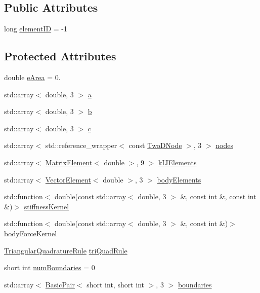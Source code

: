 \subsection*{Public Attributes}
\begin{DoxyCompactItemize}
\item 
long \hyperlink{a00764_a5feb92c27270536c92fcb39c6fecc00d}{element\+ID} = -\/1
\end{DoxyCompactItemize}
\subsection*{Protected Attributes}
\begin{DoxyCompactItemize}
\item 
double \hyperlink{a00764_ab74cbf3ff783201003c53439f79307e4}{e\+Area} = 0.
\item 
std\+::array$<$ double, 3 $>$ \hyperlink{a00764_af5cd851c5a4385f954bfc31b8eca81be}{a}
\item 
std\+::array$<$ double, 3 $>$ \hyperlink{a00764_a6581eba2e216eb5f3e93e047be680a82}{b}
\item 
std\+::array$<$ double, 3 $>$ \hyperlink{a00764_a2a9d18beac7fccf750846723ddf73d1d}{c}
\item 
std\+::array$<$ std\+::reference\+\_\+wrapper$<$ const \hyperlink{a00189_a92dafcc05a788e1065a5792b67f0f70e}{Two\+D\+Node} $>$, 3 $>$ \hyperlink{a00764_a6275d38ed2cfa924b1a36e0f98ce7c16}{nodes}
\item 
std\+::array$<$ \hyperlink{a00189_a1a12603621e7a1efa59ac5cb79f9d509}{Matrix\+Element}$<$ double $>$, 9 $>$ \hyperlink{a00764_a9126763a046ac0736d72b6b5d20ba80d}{k\+I\+J\+Elements}
\item 
std\+::array$<$ \hyperlink{a00189_a08f01d4bb892cf7b2386d0f3a8643d72}{Vector\+Element}$<$ double $>$, 3 $>$ \hyperlink{a00764_a8a85094c0060a67aa1b6abf4a5e660a6}{body\+Elements}
\item 
std\+::function$<$ double(const std\+::array$<$ double, 3 $>$ \&, const int \&, const int \&)$>$ \hyperlink{a00764_ae2480b5335fe78245cb1006e3eeb034d}{stiffness\+Kernel}
\item 
std\+::function$<$ double(const std\+::array$<$ double, 3 $>$ \&, const int \&)$>$ \hyperlink{a00764_a48dbf56bce64a1e97332b03309720154}{body\+Force\+Kernel}
\item 
\hyperlink{a00856}{Triangular\+Quadrature\+Rule} \hyperlink{a00764_a5e50303ae2cfb783f44de143be8a9aac}{tri\+Quad\+Rule}
\item 
short int \hyperlink{a00764_a70ceb410983c87c36546a2a95306dac6}{num\+Boundaries} = 0
\item 
std\+::array$<$ \hyperlink{a00768}{Basic\+Pair}$<$ short int, short int $>$, 3 $>$ \hyperlink{a00764_afabe9f08624f60c70b8a7023d919da4e}{boundaries}
\end{DoxyCompactItemize}



